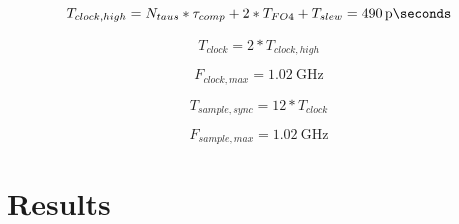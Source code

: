 \documentclass[10pt,journal]{IEEEtran}\usepackage{longtable}
\begin{document}
\begin{equation}
  T_{clock,high} = N_{taus} * \tau_{comp} + 2 * T_{FO4} + T_{slew} = \SI{490}{\pico\seconds}
\end{equation}

\begin{equation}
  T_{clock} = 2 * T_{clock,high}
\end{equation}

\begin{equation}
  F_{clock,max} = \SI{1.02}{\giga\hertz}
\end{equation}

\begin{equation}
  T_{sample,sync} = 12 * T_{clock}
\end{equation}

\begin{equation}
  F_{sample,max} = \SI{1.02}{\giga\hertz}
\end{equation}






\section{Results}
\end{document}
